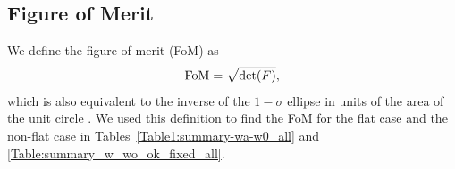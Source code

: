 \documentclass[useAMS,usenatbib]{mn2e}
\begin{document}
\subsection{Figure of Merit}
We define the figure of merit (FoM) as
\begin{equation}
{\rm FoM} = \sqrt{{\rm det}( F )},
\end{equation}  
which is also equivalent to the inverse of the $1-\sigma$ ellipse in units of the area of the unit circle \citep{BASSETT2011, Coe:2009xf}.
We used this definition  to find the FoM for the flat case and the non-flat case in Tables~\ref{Table1:summary-wa-w0_all} and \ref{Table:summary_w_wo_ok_fixed_all}. 
%
%
%
%
\end{document}
